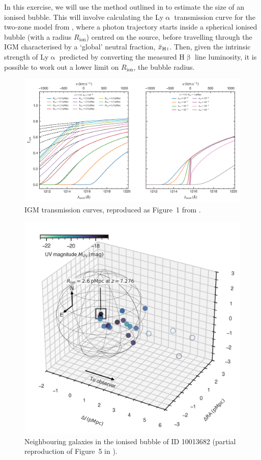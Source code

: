 \documentclass{article}
\newcommand{\Lya}{{Ly\ensuremath{\upalpha}}\xspace}
\newcommand{\HI}{\hbox{H\,{\sc i}}\xspace}
\newcommand{\Hbeta}{\ensuremath{\mathrm{H}\upbeta}\xspace}
\theoremstyle{definition}
\begin{document}
In this exercise, we will use the method outlined in \citet{2024A&A...682A..40W} to estimate the size of an ionised bubble. This will involve calculating the \Lya transmission curve for the two-zone model from \citet{2020MNRAS.499.1395M}, where a photon trajectory starts inside a spherical ionised bubble (with a radius $R_\text{ion}$) centred on the source, before travelling through the IGM characterised by a `global' neutral fraction, $\bar{x}_\text{\HI}$. Then, given the intrinsic strength of \Lya predicted by converting the measured \Hbeta line luminosity, it is possible to work out a lower limit on $R_\text{ion}$, the bubble radius.
\begin{figure}
	\centering
	\includegraphics[width=\linewidth]{"Lya_bubble_transmission"}
	\caption{IGM transmission curves, reproduced as Figure~1 from \citet{2020MNRAS.499.1395M}.
	}
	\label{fig:IGM_transmission}
\end{figure}
\begin{figure}
	\centering
	\includegraphics[width=\linewidth]{"10013682_3D_mapping"}
	\caption{Neighbouring galaxies in the ionised bubble of ID 10013682 (partial reproduction of Figure~5 in \citealt{2024A&A...682A..40W}).
	}
	\label{fig:IGM_transmission}
\end{figure}
\end{document}
